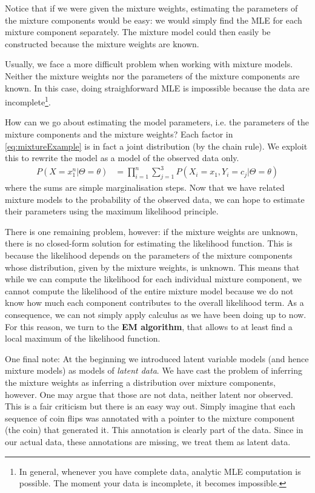 \documentclass[a4paper,11pt,leqno]{report}\usepackage[]{graphicx}\usepackage[]{color}
\begin{document}
Notice that if we were given the mixture weights, estimating
the parameters of the mixture components would be easy: we would simply find the MLE for each mixture component separately. The mixture
model could then easily be constructed because the mixture weights are known. 

Usually, we face a more difficult problem when working with mixture models. Neither the mixture
weights nor the parameters of the mixture components are known. In this case, doing straighforward MLE is impossible because the data are
incomplete\footnote{In general, whenever you have complete data, analytic MLE computation is possible. The moment your data is incomplete, it becomes impossible.}. 

How can we go about estimating the model parameters, i.e. the parameters of the mixture components and the mixture weights?
Each factor
in \eqref{eq:mixtureExample} is in fact a joint distribution (by the chain rule). We exploit this to rewrite the model as a model of the
observed data only.
\begin{align}\label{eq:marginal}
P(X=x_{1}^{n}| \Theta= \theta) &= \prod_{i=1}^{n} \sum_{j=1}^{3} P(X_{i}=x_{1},Y_{i}=c_{j}| \Theta= \theta)
\end{align}
where the sums are simple marginalisation steps. Now that we have related mixture models to the probability of the observed data, we can hope to estimate
their parameters using the maximum likelihood principle.

There is one remaining problem, however: if the mixture weights are unknown, there is no closed-form solution for estimating the likelihood function. This is because
the likelihood depends on the parameters of the mixture components whose distribution, given
by the mixture weights, is unknown. This means that while we can compute the likelihood for each
individual mixture component, we cannot compute the likelihood of the entire mixture model because we
do not know how much each component contributes to the overall likelihood term. As a consequence, we can not 
simply apply calculus as we have been doing up to now. For this reason, we turn to the \textbf{EM algorithm}, 
that allows to at least find a local maximum of the likelihood function.

One final note: At the beginning we introduced latent variable models (and hence mixture models) as models
of \textit{latent data}. We have cast the problem of inferring the mixture weights as inferring a 
distribution over mixture components, however. One may argue that those are not data, neither latent nor 
observed. This is a fair criticism but there is an easy way out. Simply imagine that each sequence of coin
flips was annotated with a pointer to the mixture component (the coin) that generated it. This annotation
is clearly part of the data. Since in our actual data, these annotations are missing, we treat them as 
latent data.
\end{document}
